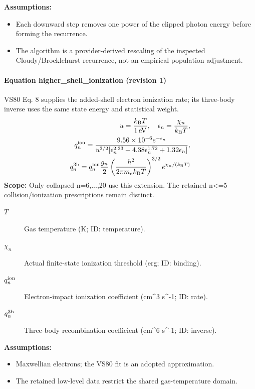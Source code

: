 \noindent\textbf{Assumptions:}
\begin{itemize}
\item Each downward step removes one power of the clipped photon energy before forming the recurrence.
\item The algorithm is a provider-derived rescaling of the inspected Cloudy/Brocklehurst recurrence, not an empirical population adjustment.
\end{itemize}

\paragraph{Equation higher\_shell\_ionization (revision 1)}
VS80 Eq. 8 supplies the added-shell electron ionization rate; its three-body inverse uses the same state energy and statistical weight.
\begin{equation}
\begin{aligned}
u=\frac{k_{\rm B}T}{1\,\mathrm{eV}},\quad\epsilon_n=\frac{\chi_n}{k_{\rm B}T},\\q_n^{\rm ion}=\frac{9.56\times10^{-6}e^{-\epsilon_n}}{u^{3/2}[\epsilon_n^{2.33}+4.38\epsilon_n^{1.72}+1.32\epsilon_n]},\\q_n^{\rm 3b}=q_n^{\rm ion}\frac{g_n}{2}\left(\frac{h^2}{2\pi m_e k_{\rm B}T}\right)^{3/2}e^{\chi_n/(k_{\rm B}T)}
\end{aligned}
\label{eq:escape.atom_5f_convergence:higher_5f_shell_5f_ionization:1}
\end{equation}
\noindent\textbf{Scope:} Only collapsed n=6,...,20 use this extension. The retained n<=5 collision/ionization prescriptions remain distinct.

\begin{description}
\item[$T$] Gas temperature (K; ID: temperature).
\item[$\chi_n$] Actual finite-state ionization threshold (erg; ID: binding).
\item[$q_n^{\rm ion}$] Electron-impact ionization coefficient (cm\textasciicircum{}3 s\textasciicircum{}-1; ID: rate).
\item[$q_n^{\rm 3b}$] Three-body recombination coefficient (cm\textasciicircum{}6 s\textasciicircum{}-1; ID: inverse).
\end{description}

\noindent\textbf{Assumptions:}
\begin{itemize}
\item Maxwellian electrons; the VS80 fit is an adopted approximation.
\item The retained low-level data restrict the shared gas-temperature domain.
\end{itemize}

